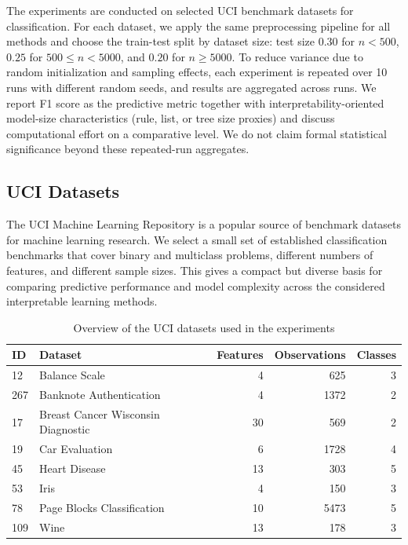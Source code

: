 \documentclass[a4paper,twoside]{article}
\begin{document}
The experiments are conducted on selected UCI benchmark datasets for classification. For each dataset, we apply the same preprocessing pipeline for all methods and choose the train-test split by dataset size: test size $0.30$ for $n<500$, $0.25$ for $500 \leq n < 5000$, and $0.20$ for $n \geq 5000$. To reduce variance due to random initialization and sampling effects, each experiment is repeated over 10 runs with different random seeds, and results are aggregated across runs. We report F1 score as the predictive metric together with interpretability-oriented model-size characteristics (rule, list, or tree size proxies) and discuss computational effort on a comparative level. We do not claim formal statistical significance beyond these repeated-run aggregates.

\subsection{UCI Datasets}

The UCI Machine Learning Repository \citep{uci_ml_repo} is a popular source of benchmark datasets for machine learning research. We select a small set of established classification benchmarks that cover binary and multiclass problems, different numbers of features, and different sample sizes. This gives a compact but diverse basis for comparing predictive performance and model complexity across the considered interpretable learning methods.

\begin{table}
  \centering
  \caption{Overview of the UCI datasets used in the experiments}
  \label{tab:uci_datasets}
  \begin{tabular}{l l r r r}
    \toprule
    ID & Dataset & Features & Observations & Classes \\
    \midrule
    12 & Balance Scale & 4 & 625 & 3 \\
    267 & Banknote Authentication & 4 & 1372 & 2 \\
    17 & Breast Cancer Wisconsin Diagnostic & 30 & 569 & 2 \\
    19 & Car Evaluation & 6 & 1728 & 4 \\
    45 & Heart Disease & 13 & 303 & 5 \\
    53 & Iris & 4 & 150 & 3 \\
    78 & Page Blocks Classification & 10 & 5473 & 5 \\
    109 & Wine & 13 & 178 & 3 \\
    \bottomrule
  \end{tabular}
\end{table}
\end{document}
